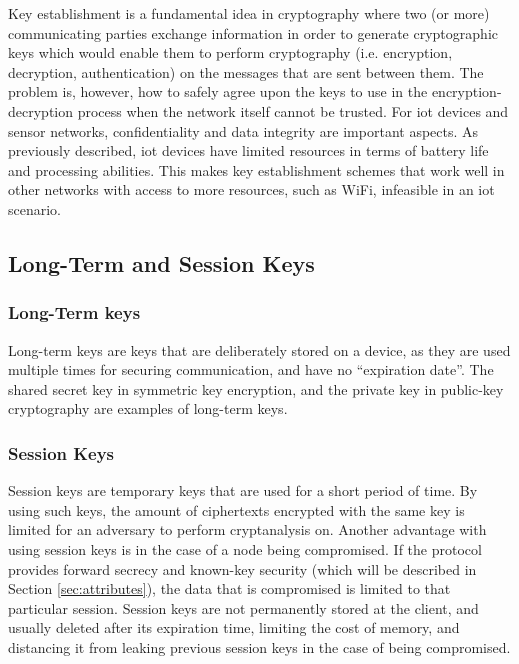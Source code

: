 Key establishment is a fundamental idea in cryptography where two (or more) communicating parties exchange information in order to generate cryptographic keys which would enable them to perform cryptography (i.e. encryption, decryption, authentication) on the messages that are sent between them. The problem is, however, how to safely agree upon the keys to use in the encryption-decryption process when the network itself cannot be trusted. For \gls{iot} devices and sensor networks, confidentiality and data integrity are important aspects. As previously described, \gls{iot} devices have limited resources in terms of battery life and processing abilities. This makes key establishment schemes that work well in other networks with access to more resources, such as WiFi, infeasible in an \gls{iot} scenario.


\subsection{Long-Term and Session Keys}


\subsubsection{Long-Term keys}

Long-term keys are keys that are deliberately stored on a device, as they are used multiple times for securing communication, and have no ``expiration date''. The shared secret key in symmetric key encryption, and the private key in public-key cryptography are examples of long-term keys.


\subsubsection{Session Keys}

Session keys are temporary keys that are used for a short period of time. By using such keys, the amount of ciphertexts encrypted with the same key is limited for an adversary to perform cryptanalysis on. Another advantage with using session keys is in the case of a node being compromised. If the protocol provides forward secrecy and known-key security (which will be described in Section \ref{sec:attributes}), the data that is compromised is limited to that particular session. Session keys are not permanently stored at the client, and usually deleted after its expiration time, limiting the cost of memory, and distancing it from leaking previous session keys in the case of being compromised.




